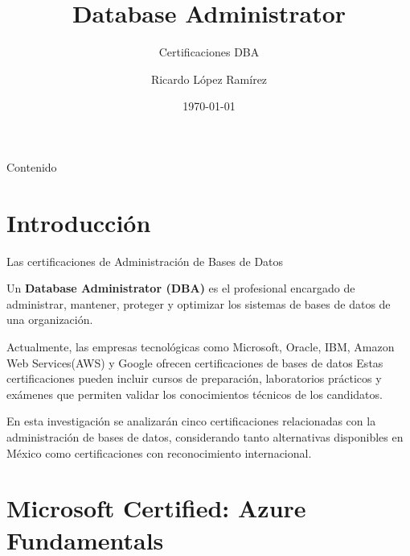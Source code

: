 \documentclass[aspectratio=169,10pt]{beamer}
\title[
    Certificaciones DBA
]{
    Database Administrator
}
\subtitle{
    Certificaciones DBA
}
\author{
    Ricardo López Ramírez
}
\institute{
    Facultad de Estudios Superiores Acatlán \\
    Matemáticas Aplicadas y Computación
}
\date{\today}
\begin{document}
\begin{frame}
    \titlepage
\end{frame}


\begin{frame}{Contenido}
    \tableofcontents
\end{frame}



\section{Introducción}

\begin{frame}{Las certificaciones de Administración de Bases de Datos}

    \begin{block}{}
        Un \textbf{Database Administrator (DBA)} es el profesional
        encargado de administrar, mantener, proteger y optimizar
        los sistemas de bases de datos de una organización.
    \end{block}

    \vspace{1mm}

    Actualmente, las empresas tecnológicas como Microsoft, Oracle, IBM, 
    Amazon Web Services(AWS) y Google ofrecen certificaciones de bases de datos
    Estas certificaciones pueden incluir cursos de preparación, laboratorios prácticos y exámenes que 
    permiten validar los conocimientos técnicos de los candidatos.

    \vspace{1mm}

    En esta investigación se analizarán cinco certificaciones relacionadas con la administración de bases de datos, considerando tanto alternativas disponibles en México como certificaciones con reconocimiento internacional.

\end{frame}


\section{Microsoft Certified: Azure Fundamentals}
\end{document}
